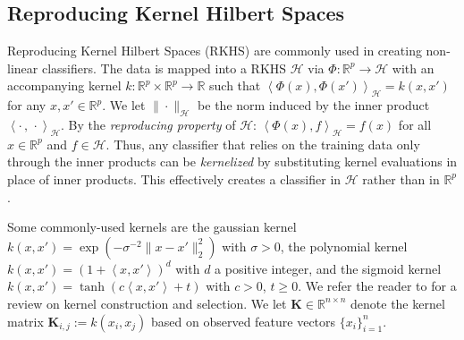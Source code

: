 \documentclass[twoside, onecolumn]{article}
\def\R{\mathbb{R}}
\def\Hcal{\mathcal{H}}
\def\Hcal{\mathcal{H}}
\DeclareMathOperator*{\maximize}{maximize}
\begin{document}



\subsection{Reproducing Kernel Hilbert Spaces}\label{sec:ReproducingKernelHilbertSpace}

Reproducing Kernel Hilbert Spaces (RKHS) are commonly used in creating non-linear classifiers. The data is mapped into a RKHS $\mathcal{H}$ via $\Phi:\mathbb{R}^{p}\to \mathcal{H}$ with an accompanying kernel
$k:\mathbb{R}^{p}\times \mathbb{R}^{p}\to\mathbb{R}$ such that $\left<\Phi(x),\Phi(x')\right>_{\mathcal{H}}=k(x,x')$ for any $x, x' \in \mathbb{R}^{p}$. We let $\|\cdot\|_{\mathcal{H}}$ be the norm induced by the inner product $\left<\cdot\,,\,\cdot\right>_\mathcal{H}$. By the \emph{reproducing property} of $\mathcal{H}$: $\left<\Phi(x), f\right>_{\Hcal}=f(x)$ for all $x\in \mathbb{R}^{p}$ and $f\in \mathcal{H}$. Thus, any classifier that relies on the training data only through the inner products can be \emph{kernelized} by substituting kernel evaluations in place of inner products. This effectively creates a classifier in $\mathcal{H}$ rather than in $\R^p$. 

Some commonly-used kernels are the gaussian kernel $k(x,x')=\exp(-\sigma^{-2} \|x-x'\|_{2}^2)$ with $\sigma >0$, the polynomial kernel $k(x,x')= (1+\left<x, x'\right>)^{d}$ with $d$ a positive integer, and the sigmoid kernel $k(x,x')=\tanh(c\left<x, x'\right>+t)$ with $c>0$, $t\geq 0$.
We refer the reader to \cite[Chapter 13]{bernhard_scholkopf_learning_2002} for a review on kernel construction and selection. We let $\mathbf{K}\in \mathbb{R}^{n\times n}$ denote the kernel matrix $\mathbf{K}_{i,j}:=k(x_i, x_j)$ based on observed feature vectors $\{x_i\}_{i=1}^n$.
\end{document}
